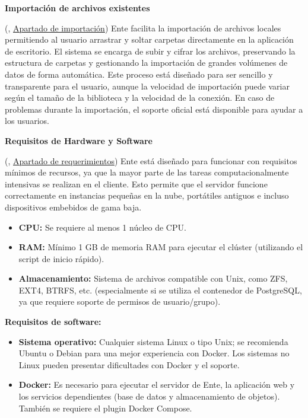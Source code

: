 \textbf{Importación de archivos existentes}

(\cite{ente-documentation}, \href{https://docs.photoprism.app/developer-guide/media/import/}{Apartado de importación}) Ente facilita la importación de archivos locales permitiendo al usuario arrastrar y soltar carpetas directamente en la aplicación de escritorio. El sistema se encarga de subir y cifrar los archivos, preservando la estructura de carpetas y gestionando la importación de grandes volúmenes de datos de forma automática. Este proceso está diseñado para ser sencillo y transparente para el usuario, aunque la velocidad de importación puede variar según el tamaño de la biblioteca y la velocidad de la conexión. En caso de problemas durante la importación, el soporte oficial está disponible para ayudar a los usuarios.

\textbf{Requisitos de Hardware y Software}

(\cite{ente-documentation}, \href{https://docs.ente.io/self-host/requirements}{Apartado de requerimientos}) Ente está diseñado para funcionar con requisitos mínimos de recursos, ya que la mayor parte de las tareas computacionalmente intensivas se realizan en el cliente. Esto permite que el servidor funcione correctamente en instancias pequeñas en la nube, portátiles antiguos e incluso dispositivos embebidos de gama baja.

\begin{itemize}
    \item \textbf{CPU:} Se requiere al menos 1 núcleo de CPU.
    \item \textbf{RAM:} Mínimo 1 GB de memoria RAM para ejecutar el clúster (utilizando el script de inicio rápido).
    \item \textbf{Almacenamiento:} Sistema de archivos compatible con Unix, como ZFS, EXT4, BTRFS, etc. (especialmente si se utiliza el contenedor de PostgreSQL, ya que requiere soporte de permisos de usuario/grupo).
\end{itemize}

\textbf{Requisitos de software:}
\begin{itemize}
    \item \textbf{Sistema operativo:} Cualquier sistema Linux o tipo Unix; se recomienda Ubuntu o Debian para una mejor experiencia con Docker. Los sistemas no Linux pueden presentar dificultades con Docker y el soporte.
    \item \textbf{Docker:} Es necesario para ejecutar el servidor de Ente, la aplicación web y los servicios dependientes (base de datos y almacenamiento de objetos). También se requiere el plugin Docker Compose.
\end{itemize}

